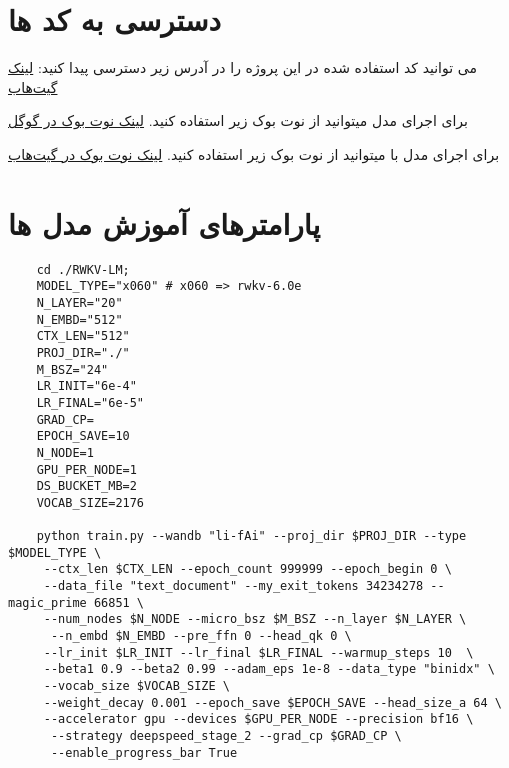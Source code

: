 
\section{دسترسی به کد ها}\label{ap:codes}
می توانید کد استفاده شده در این پروژه را در آدرس زیر دسترسی پیدا کنید:
\href{https://github.com/soheilsalimidev/lo-fAi}{لینک گیت‌هاب}

برای اجرای مدل میتوانید از نوت‌ بوک زیر استفاده کنید.
\href{https://colab.research.google.com/drive/1mc6A0XWgNbJECqkoU0uCluzjcSxVfyuY?usp=sharing}{لینک نوت‌ بوک در گوگل }

برای اجرای مدل با  میتوانید از نوت‌ بوک زیر استفاده کنید.
\href{https://github.com/soheilsalimidev/lo-fAi/blob/main/packages/pipe/pipe.ipynb}{لینک نوت‌ بوک در گیت‌هاب}


\section{ پارامترهای آموزش مدل ها}\label{ap:parmas}
\begin{LTR}
  \begin{verbatim}
    cd ./RWKV-LM;
    MODEL_TYPE="x060" # x060 => rwkv-6.0e
    N_LAYER="20"
    N_EMBD="512"
    CTX_LEN="512"
    PROJ_DIR="./"
    M_BSZ="24" 
    LR_INIT="6e-4"
    LR_FINAL="6e-5"
    GRAD_CP=
    EPOCH_SAVE=10
    N_NODE=1
    GPU_PER_NODE=1
    DS_BUCKET_MB=2
    VOCAB_SIZE=2176
    
    python train.py --wandb "li-fAi" --proj_dir $PROJ_DIR --type $MODEL_TYPE \
     --ctx_len $CTX_LEN --epoch_count 999999 --epoch_begin 0 \
     --data_file "text_document" --my_exit_tokens 34234278 --magic_prime 66851 \
     --num_nodes $N_NODE --micro_bsz $M_BSZ --n_layer $N_LAYER \
      --n_embd $N_EMBD --pre_ffn 0 --head_qk 0 \
     --lr_init $LR_INIT --lr_final $LR_FINAL --warmup_steps 10  \
     --beta1 0.9 --beta2 0.99 --adam_eps 1e-8 --data_type "binidx" \
     --vocab_size $VOCAB_SIZE \
     --weight_decay 0.001 --epoch_save $EPOCH_SAVE --head_size_a 64 \
     --accelerator gpu --devices $GPU_PER_NODE --precision bf16 \
      --strategy deepspeed_stage_2 --grad_cp $GRAD_CP \
      --enable_progress_bar True
  \end{verbatim}
\end{LTR}
